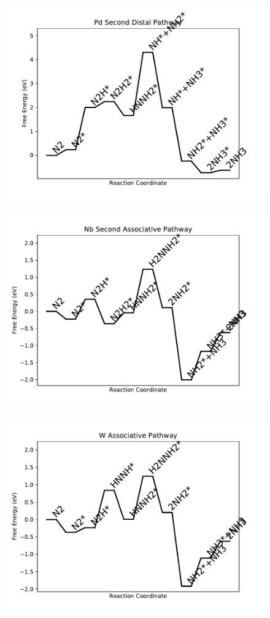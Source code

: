 \begin{figure}
\includegraphics[width=0.8\linewidth]{data/plots/Pd_distal_2.pdf}
\label{fig:Pd_distal_2}
\end{figure}

\begin{figure}
\includegraphics[width=0.8\linewidth]{data/plots/Nb_associative_2.pdf}
\label{fig:Nb_associative_2}
\end{figure}

\begin{figure}
\includegraphics[width=0.8\linewidth]{data/plots/W_associative.pdf}
\label{fig:W_associative}
\end{figure}

